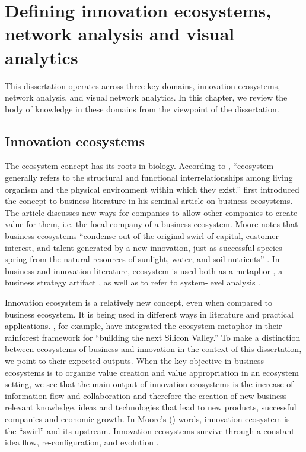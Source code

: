 \chapter{Defining innovation ecosystems, network analysis and visual analytics}
\label{ch:background}

This dissertation operates across three key domains,  innovation ecosystems, network analysis, and visual network analytics. In this chapter, we review the body of knowledge in these domains from the viewpoint of the dissertation.

\section{Innovation ecosystems}
\label{sec:innovationecosystems}

The ecosystem concept has its roots in biology. According to \cite{Moran1990ThePractice}, ``ecosystem generally refers to the structural and functional interrelationships among living organism and the physical environment within which they exist.'' \cite{Moore1993PredatorsCompetition} first introduced the concept to business literature in his seminal article on business ecosystems. The article discusses new ways for companies to allow other companies to create value for them, i.e. the focal company of a business ecosystem. Moore notes that business ecosystems ``condense out of the original swirl of capital, customer interest, and talent generated by a new innovation, just as successful species spring from the natural resources of sunlight, water, and soil nutrients'' \citep{Moore1993PredatorsCompetition}. In business and innovation literature, ecosystem is used both as a metaphor \citep[e.g.][]{Hwang2012,Huhtamaki2011AFinancing}, a business strategy artifact \citep{Moore1993PredatorsCompetition}, as well as to refer to system-level analysis \citep[cf.][]{Pentland2015}.

Innovation ecosystem is a relatively new concept, even when compared to business ecosystem. It is being used in different ways in literature and practical applications. \cite{Hwang2012}, for example, have integrated the ecosystem metaphor in their rainforest framework for ``building the next Silicon Valley.'' To make a distinction between ecosystems of business and innovation in the context of this dissertation, we point to their expected outputs. When the key objective in business ecosystems is to organize value creation and value appropriation in an ecosystem setting, we see that the main output of innovation ecosystems is the increase of information flow and collaboration and therefore the creation of new business-relevant knowledge, ideas and technologies that lead to new products, successful companies and economic growth. In Moore's (\citeyear{Moore1993PredatorsCompetition}) words, innovation ecosystem is the ``swirl'' and its upstream. Innovation ecosystems survive through a constant idea flow, re-configuration, and evolution \citep[cf.][]{Pentland2015}.

